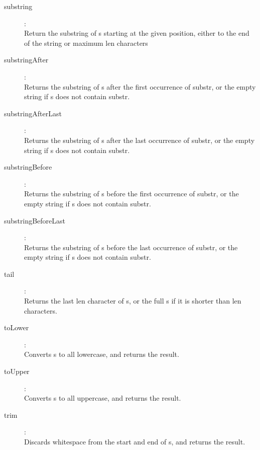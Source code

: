\begin{description}
\item[substring]:  \\
    Return the substring of s starting at the given position, either to the end
    of the string or maximum len characters

\item[substringAfter]:  \\
    Returns the substring of s after the first occurrence of substr, or the
    empty string if s does not contain substr.

\item[substringAfterLast]:  \\
    Returns the substring of s after the last occurrence of substr, or the
    empty string if s does not contain substr.

\item[substringBefore]:  \\
    Returns the substring of s before the first occurrence of substr, or the
    empty string if s does not contain substr.

\item[substringBeforeLast]:  \\
    Returns the substring of s before the last occurrence of substr, or the
    empty string if s does not contain substr.

\item[tail]:  \\
    Returns the last len character of s, or the full s if it is shorter than
    len characters.

\item[toLower]:  \\
    Converts s to all lowercase, and returns the result.

\item[toUpper]:  \\
    Converts s to all uppercase, and returns the result.

\item[trim]:  \\
    Discards whitespace from the start and end of s, and returns the result.


\end{description}

